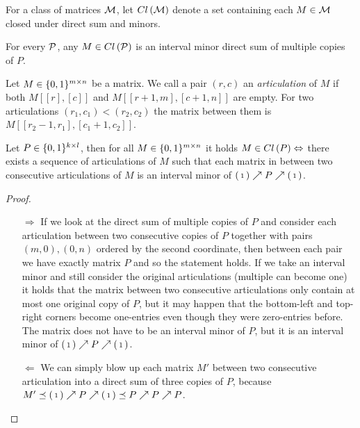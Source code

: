 \begin{defn}
For a class of matrices $\mathcal{M}$, let $Cl\left(\mathcal{M}\right)$ denote a set containing each $M\in\mathcal{M}$ closed under direct sum and minors.
\end{defn}

\begin{obs}
For every $\mathcal{P}$, any $M\in Cl\left(\mathcal{P}\right)$ is an interval minor direct sum of multiple copies of $P$.
\end{obs}

\begin{defn}
Let $M\in\{0,1\}^{m\times n}$ be a matrix. We call a pair $(r,c)$ an \emph{articulation} of $M$ if both $M[[r],[c]]$ and $M[[r+1,m],[c+1,n]]$ are empty. For two articulations $(r_1,c_1)<(r_2,c_2)$ the matrix between them is $M[[r_2-1,r_1],[c_1+1,c_2]]$.
\end{defn}

\begin{lemma}
\label{lemma:artic}
Let $P\in\{0,1\}^{k\times l}$, then for all $M\in\{0,1\}^{m\times n}$ it holds $M\in Cl\left(P\right)\Leftrightarrow$ there exists a sequence of articulations of $M$ such that each matrix in between two consecutive articulations of $M$ is an interval minor of $\left(\begin{smallmatrix}1\end{smallmatrix}\right)\nearrow P\nearrow\left(\begin{smallmatrix}1\end{smallmatrix}\right)$.
\end{lemma}
\begin{proof}
\begin{itemize}
	\item[$\Rightarrow$] If we look at the direct sum of multiple copies of $P$ and consider each articulation between two consecutive copies of $P$ together with pairs $(m,0),(0,n)$ ordered by the second coordinate, then between each pair we have exactly matrix $P$ and so the statement holds. If we take an interval minor and still consider the original articulations (multiple can become one) it holds that the matrix between two consecutive articulations only contain at most one original copy of $P$, but it may happen that the bottom-left and top-right corners become one-entries even though they were zero-entries before. The matrix does not have to be an interval minor of $P$, but it is an interval minor of $\left(\begin{smallmatrix}1\end{smallmatrix}\right)\nearrow P\nearrow\left(\begin{smallmatrix}1\end{smallmatrix}\right)$.
	\item[$\Leftarrow$] We can simply blow up each matrix $M'$ between two consecutive articulation into a direct sum of three copies of $P$, because $M'\preceq\left(\begin{smallmatrix}1\end{smallmatrix}\right)\nearrow P\nearrow\left(\begin{smallmatrix}1\end{smallmatrix}\right)\preceq P\nearrow P\nearrow P$.
\end{itemize}
\end{proof}

